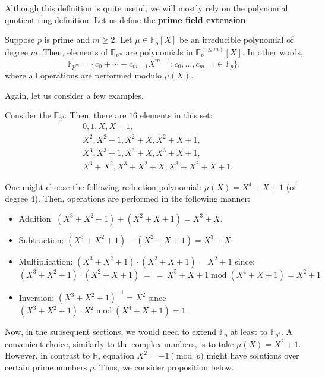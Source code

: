 \documentclass[../lecture-notes.tex]{subfiles}
\begin{document}
Although this definition is quite useful, we will mostly rely on the polynomial quotient ring definition. Let us define the \textbf{prime field extension}.

\begin{definition}
    Suppose $p$ is prime and $m \geq 2$. Let $\mu \in \mathbb{F}_p[X]$ be an irreducible polynomial of degree $m$. Then, elements of $\mathbb{F}_{p^m}$ are polynomials in $\mathbb{F}_p^{(\leq m)}[X]$. In other words,
    \begin{equation*}
        \mathbb{F}_{p^m} = \{c_0+\cdots+c_{m-1}X^{m-1}: c_0,\dots,c_{m-1} \in \mathbb{F}_p\},
    \end{equation*}
    where all operations are performed modulo $\mu(X)$.
\end{definition}

Again, let us consider a few examples.

\begin{example}
    Consider the $\mathbb{F}_{2^4}$. Then, there are $16$ elements in this set:
    \begin{equation*}
        \begin{aligned}
            &0, 1, X, X+1,\\ &X^2, X^2+1, X^2+X, X^2+X+1,\\
            &X^3, X^3+1, X^3+X, X^3+X+1,\\ &X^3+X^2, X^3+X^2+X, X^3+X^2+X+1.
        \end{aligned}
    \end{equation*}

    One might choose the following reduction polynomial: $\mu(X)=X^4+X+1$ (of degree $4$). Then, operations are performed in the following manner:
    \begin{itemize}
        \item Addition: $(X^3+X^2+1)+(X^2+X+1) = X^3+X$.
        \item Subtraction: $(X^3+X^2+1)-(X^2+X+1) = X^3+X$.
        \item Multiplication: $(X^3+X^2+1)\cdot(X^2+X+1)=X^2+1$ since:
            $(X^3+X^2+1)\cdot(X^2+X+1)~= \, =~X^5+X+1 \; \text{mod} \; (X^4+X+1) = X^2+1$
        \item Inversion: $(X^3+X^2+1)^{-1}=X^2$ since $(X^3+X^2+1)\cdot X^2 \; \text{mod} \; (X^4+X+1) = 1$.
    \end{itemize}
\end{example}

Now, in the subsequent sections, we would need to extend $\mathbb{F}_p$ at least to $\mathbb{F}_{p^2}$. A convenient choice, similarly to the complex numbers, is to take $\mu(X)=X^2+1$. However, in contrast to $\mathbb{R}$, equation $X^2=-1 \pmod{p}$ might have solutions over certain prime numbers $p$. Thus, we consider proposition below.
\end{document}
